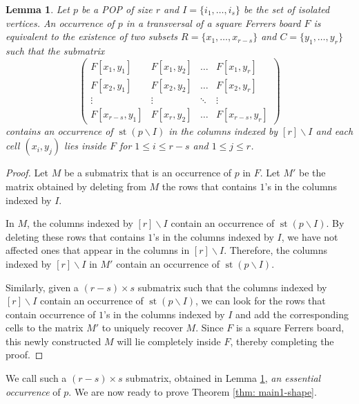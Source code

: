 \documentclass[12pt, english, a4paper]{article}
\DeclareMathOperator{\st}{st}
\theoremstyle{plain}
\newtheorem{lemma}[theorem]{Lemma}
\theoremstyle{definition}
\theoremstyle{remark}
\begin{document}
\begin{lemma}\label{lem: isolated-occ}
     Let $p$ be a POP of size $r$ and $I=\{i_1,\dots, i_s\}$ be the set of isolated vertices. An occurrence of $p$ in a transversal of a square Ferrers board $F$ is equivalent to the existence of two subsets $R=\{x_1,\dots,x_{r-s}\}$ and $C=\{ y_1,\dots, y_r \}$ such that the submatrix 
    $$\begin{pmatrix}
        F[x_1,y_1]&F[x_1,y_2]&\dots&F[x_1,y_r]\\
        F[x_2,y_1]&F[x_2,y_2]&\dots&F[x_2,y_r]\\
        \vdots&\vdots&\ddots &\vdots\\
        F[x_{r-s},y_1]&F[x_r,y_2]&\dots&F[x_{r-s},y_r]
    \end{pmatrix}$$
    contains an occurrence of $\st(p\backslash I)$ in the columns indexed by $[r]\backslash I$ and each cell $(x_i,y_j)$ lies inside $F$ for $1\le i\le r-s$ and $1\le j\le r$.
\end{lemma}
\begin{proof}
Let $M$ be a submatrix that is an occurrence of $p$ in $F$.  Let $M'$ be the matrix obtained by deleting from $M$ the rows that contains $1$'s in the columns indexed by $I$. %

In $M$, the columns indexed by $[r]\backslash I$ contain an occurrence of $\st(p\backslash I)$. By deleting these rows that contains $1$'s in the columns indexed by $I$, we have not affected ones that appear in the columns in $[r]\backslash I$. Therefore, the columns indexed by $[r]\backslash I$ in $M'$ contain an occurrence of $\st(p\backslash I)$.

Similarly, given a $(r-s) \times s$ submatrix such that the columns indexed by $[r]\backslash I$ contain an occurrence of $\st(p\backslash I)$, we can look for the rows that contain occurrence of $1$'s in the columns indexed by $I$ and add the corresponding cells to the matrix $M'$ to uniquely recover $M$. Since $F$ is a square Ferrers board, this newly constructed $M$ will lie completely inside $F$, thereby completing the proof.
\end{proof}
We call such a $(r-s)\times s$ submatrix, obtained in Lemma \ref{lem: isolated-occ}, \emph{an essential occurrence} of $p$.
We are now ready to prove Theorem \ref{thm: main1-shape}.
\end{document}
